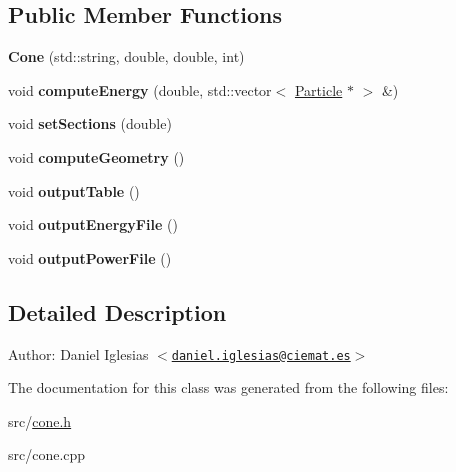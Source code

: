\subsection*{Public Member Functions}
\begin{CompactItemize}
\item 
\hypertarget{classCone_da9d6b717b3e91609b2500eba83e3c21}{
\textbf{Cone} (std::string, double, double, int)}
\label{classCone_da9d6b717b3e91609b2500eba83e3c21}

\item 
\hypertarget{classCone_984487f56d87dfa483c5bb957ae24eb3}{
void \textbf{computeEnergy} (double, std::vector$<$ \hyperlink{classParticle}{Particle} $\ast$ $>$ \&)}
\label{classCone_984487f56d87dfa483c5bb957ae24eb3}

\item 
\hypertarget{classCone_52fd80b6c484449a8d24d1471e21873c}{
void \textbf{setSections} (double)}
\label{classCone_52fd80b6c484449a8d24d1471e21873c}

\item 
\hypertarget{classCone_98c5dc0bc0561ab92e76a8ab4da2f891}{
void \textbf{computeGeometry} ()}
\label{classCone_98c5dc0bc0561ab92e76a8ab4da2f891}

\item 
\hypertarget{classCone_a026083e1c8ecfd1f589eb1939b302c1}{
void \textbf{outputTable} ()}
\label{classCone_a026083e1c8ecfd1f589eb1939b302c1}

\item 
\hypertarget{classCone_1df030d3ae438a08c7b34bbb63382e04}{
void \textbf{outputEnergyFile} ()}
\label{classCone_1df030d3ae438a08c7b34bbb63382e04}

\item 
\hypertarget{classCone_d80275cb6371a959b037e93ec2ad5bdf}{
void \textbf{outputPowerFile} ()}
\label{classCone_d80275cb6371a959b037e93ec2ad5bdf}

\end{CompactItemize}


\subsection{Detailed Description}
\begin{Desc}
\item[Author:]Daniel Iglesias $<$\href{mailto:daniel.iglesias@ciemat.es}{\tt daniel.iglesias@ciemat.es}$>$ \end{Desc}


The documentation for this class was generated from the following files:\begin{CompactItemize}
\item 
src/\hyperlink{cone_8h}{cone.h}\item 
src/cone.cpp\end{CompactItemize}
